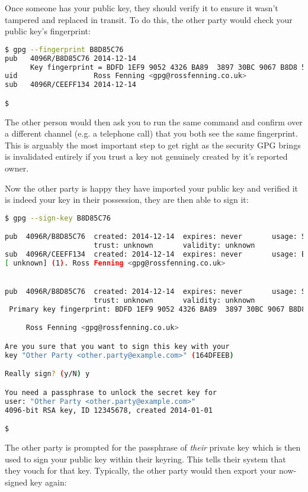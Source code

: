 \documentclass{report}
\begin{document}
Once someone has your public key, they should verify it to ensure
it wasn't tampered and replaced in transit. To do this, the other
party would check your public key's fingerprint:

\begin{lstlisting}[language=bash]
$ gpg --fingerprint B8D85C76
pub   4096R/B8D85C76 2014-12-14
      Key fingerprint = BDFD 1EF9 9052 4326 BA89  3897 30BC 9067 B8D8 5C76
uid                  Ross Fenning <gpg@rossfenning.co.uk>
sub   4096R/CEEFF134 2014-12-14

$

\end{lstlisting}

The other person would then ask you to run the same command and confirm
over a different channel (e.g. a telephone call) that you both see
the same fingerprint. This is arguably the most important step to get
right as the security GPG brings is invalidated entirely if you
trust a key not genuinely created by it's reported owner.

Now the other party is happy they have imported your public key and
verified it is indeed your key in their possession, they are then
able to sign it:

\begin{lstlisting}[language=bash]
$ gpg --sign-key B8D85C76

pub  4096R/B8D85C76  created: 2014-12-14  expires: never       usage: SC  
                     trust: unknown       validity: unknown
sub  4096R/CEEFF134  created: 2014-12-14  expires: never       usage: E   
[ unknown] (1). Ross Fenning <gpg@rossfenning.co.uk>


pub  4096R/B8D85C76  created: 2014-12-14  expires: never       usage: SC  
                     trust: unknown       validity: unknown
 Primary key fingerprint: BDFD 1EF9 9052 4326 BA89  3897 30BC 9067 B8D8 5C76

     Ross Fenning <gpg@rossfenning.co.uk>

Are you sure that you want to sign this key with your
key "Other Party <other.party@example.com>" (164DFEEB)

Really sign? (y/N) y

You need a passphrase to unlock the secret key for
user: "Other Party <other.party@example.com>"
4096-bit RSA key, ID 12345678, created 2014-01-01

$
\end{lstlisting}

The other party is prompted for the passphrase of \emph{their} private key
which is then used to sign your public key within their keyring. This
tells their system that they vouch for that key. Typically, the other
party would then export your now-signed key again:
\end{document}
